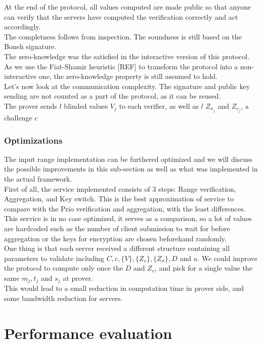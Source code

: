 \documentclass{article}
\begin{document}
At the end of the protocol, all values computed are made public so that anyone can verify that the servers have computed the verification correctly and act accordingly.\\

The completness follows from inspection. The soundness is still based on the Boneh signature.\\
The zero-knowledge was the satisfied in the interactive version of this protocol. As we use the Fiat-Shamir heuristic [REF] to transform the protocol into a  non-interactive one, the zero-knowledge property is still assumed to hold.\\

Let's now look at the communication complexity.
The signature and public key sending are not counted as a part of the protocol, as it can be reused.\\
The prover sends $l$ blinded values $V_j$ to each verifier, as well as $l$ $Z_{\sigma_j}$ and $Z_{v_j}$, a challenge $c$
\subsubsection*{Optimizations}
The input range implementation can be furthered optimized and we will discuss the possible improvements in this sub-section as well as what was implemented in the actual framework.\\
First of all, the service implemented consists of 3 steps: Range verification, Aggregation, and Key switch. This is the best approximation of service to compare with the Prio verification and aggregation, with the least differences.\\
This service is in no case optimized, it serves as a comparison, so a lot of values are hardcoded such as the number of client submission to wait for before aggregation or the keys for encryption are chosen beforehand randomly.\\

One thing is that each server received a different structure containing all parameters to validate including $C, c, \{V\}, \{Z_v\} ,\{ Z_{\sigma}\}, D $ and $a$. We could improve the protocol to compute only once the $D$ and $Z_r$, and pick for a single value the same $m_j, t_j$ and $s_j$ at prover.\\
This would lead to a small reduction in computation time in prover side, and some bandwidth reduction for servers.

\section{Performance evaluation}
\end{document}
